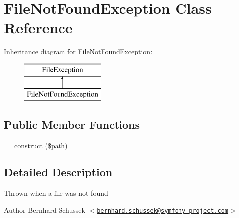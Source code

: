 \hypertarget{class_symfony_1_1_component_1_1_http_foundation_1_1_file_1_1_exception_1_1_file_not_found_exception}{
\section{\-File\-Not\-Found\-Exception \-Class \-Reference}
\label{class_symfony_1_1_component_1_1_http_foundation_1_1_file_1_1_exception_1_1_file_not_found_exception}
}
\-Inheritance diagram for \-File\-Not\-Found\-Exception\-:\begin{figure}[H]
\begin{center}
\leavevmode
\includegraphics[height=2.000000cm]{class_symfony_1_1_component_1_1_http_foundation_1_1_file_1_1_exception_1_1_file_not_found_exception}
\end{center}
\end{figure}
\subsection*{\-Public \-Member \-Functions}
\begin{DoxyCompactItemize}
\item 
\hyperlink{class_symfony_1_1_component_1_1_http_foundation_1_1_file_1_1_exception_1_1_file_not_found_exception_a03853ceaa393e487835b287de58aba5a}{\-\_\-\-\_\-construct} (\$path)
\end{DoxyCompactItemize}


\subsection{\-Detailed \-Description}
\-Thrown when a file was not found

\begin{DoxyAuthor}{\-Author}
\-Bernhard \-Schussek $<$\href{mailto:bernhard.schussek@symfony-project.com}{\tt bernhard.\-schussek@symfony-\/project.\-com}$>$ 
\end{DoxyAuthor}


